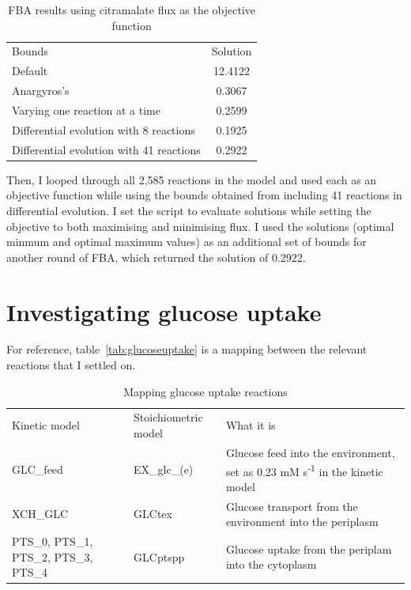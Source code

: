 \documentclass[parskip=full]{scrreprt}
\begin{document}
\begin{table}
  \caption{FBA results using citramalate flux as the objective function}
  \label{tab:citramalatefluxresults}
  \centering
  \begin{tabular}{lS}
    Bounds & Solution\\
    Default & 12.4122\\
    Anargyros's & 0.3067\\
    Varying one reaction at a time & 0.2599\\
    Differential evolution with 8 reactions & 0.1925\\
    Differential evolution with 41 reactions & 0.2922
  \end{tabular}
\end{table}

Then, I looped through all 2,585 reactions in the model and used each as an objective function while using the bounds obtained from including 41 reactions in differential evolution. I set the script to evaluate solutions while setting the objective to both maximising and minimising flux. I used the solutions (optimal minmum and optimal maximum values) as an additional set of bounds for another round of FBA, which returned the solution of 0.2922.

\section{Investigating glucose uptake}
\label{sec:glucoseuptake}

For reference, table~\vref{tab:glucoseuptake} is a mapping between the relevant reactions that I settled on.

\begin{table}
  \caption{Mapping glucose uptake reactions}
  \label{tab:glucoseuptake}
  \centering
  \begin{tabularx}{\linewidth}{LLL}
    Kinetic model & Stoichiometric model & What it is\\
    GLC\_feed & EX\_glc\_(e) & Glucose feed into the environment, set as 0.23 mM s\textsuperscript{-1} in the kinetic model\\
    XCH\_GLC & GLCtex & Glucose transport from the environment into the periplasm\\
    PTS\_0, PTS\_1, PTS\_2, PTS\_3, PTS\_4 & GLCptspp & Glucose uptake from the periplam into the cytoplasm\\
  \end{tabularx}
\end{table}
\end{document}
